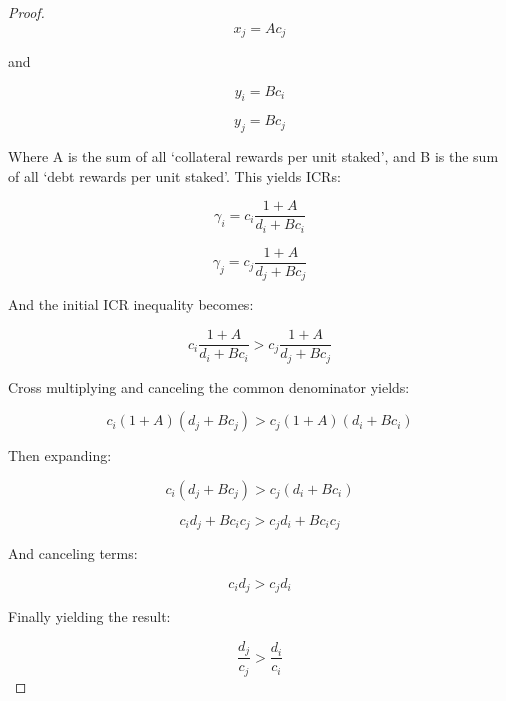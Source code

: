 \documentclass[reqno]{article}
\begin{document}
\begin{proof}
\begin{equation} 
    x_j=Ac_j
\end{equation}

and

\begin{equation} 
    y_i=Bc_i
\end{equation}

\begin{equation} 
    y_j=Bc_j
\end{equation}

\bigskip
Where A is the sum of all ‘collateral rewards per unit staked’, and B is the sum of all ‘debt rewards per unit staked’. This yields ICRs:

\begin{equation} 
    \gamma_i=c_i\frac{1+A}{d_i+Bc_i}
\end{equation}

\begin{equation} 
    \gamma_j=c_j\frac{1+A}{d_j+Bc_j}
\end{equation}

And the initial ICR inequality becomes:

\begin{equation} 
    c_i\frac{1+A}{d_i+Bc_i}>c_j\frac{1+A}{d_j+Bc_j}
\end{equation}

\bigskip
Cross multiplying and canceling the common denominator yields:

\begin{equation} 
    c_i\left(1+A\right)\left(d_j+Bc_j\right)>c_j\left(1+A\right)\left(d_i+Bc_i\right)
\end{equation}

Then expanding:

\begin{equation} 
    c_i\left(d_j+Bc_j\right)>c_j\left(d_i+Bc_i\right)
\end{equation}

\begin{equation} 
    c_id_j+Bc_ic_j > c_jd_i+Bc_ic_j
\end{equation}

\bigskip
And canceling terms:

\begin{equation}
    c_id_j > c_jd_i
\end{equation}

\bigskip
Finally yielding the result:

\begin{equation} \label{eq:217}
    \frac{d_j}{c_j}>\frac{d_i}{c_i}
\end{equation}


\end{proof}
\end{document}
